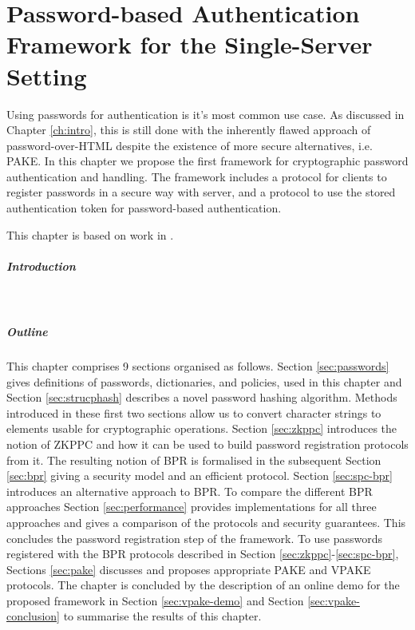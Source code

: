 \chapter[Password Authentication Framework for the Single-Server Setting]{Password-based Authentication Framework for the Single-Server Setting} \label{ch:vpake}

Using passwords for authentication is it's most common use case.
As discussed in Chapter \ref{ch:intro}, this is still done with the inherently flawed approach of password-over-\ac{HTML} despite the existence of more secure alternatives, i.e. \ac{PAKE}.
In this chapter we propose the first framework for cryptographic password authentication and handling.
The framework includes a protocol for clients to register passwords in a secure way with server, and a protocol to use the stored authentication token for password-based authentication.

\smallskip
\noindent
This chapter is based on work in \cite{Kiefer13a,KieferM15a,DongK15a}.

\paragraph{Introduction}
\hfill\\

\paragraph{Outline}
This chapter comprises 9 sections organised as follows.
Section \ref{sec:passwords} gives definitions of passwords, dictionaries, and policies, used in this chapter and Section \ref{sec:strucphash} describes a novel password hashing algorithm.
Methods introduced in these first two sections allow us to convert character strings to elements usable for cryptographic operations.
Section \ref{sec:zkppc} introduces the notion of \ac{ZKPPC} and how it can be used to build password registration protocols from it.
The resulting notion of \ac{BPR} is formalised in the subsequent Section \ref{sec:bpr} giving a security model and an efficient protocol.
Section \ref{sec:spc-bpr} introduces an alternative approach to \ac{BPR}.
To compare the different \ac{BPR} approaches Section \ref{sec:performance} provides implementations for all three approaches and gives a comparison of the protocols and security guarantees.
This concludes the password registration step of the framework.
To use passwords registered with the \ac{BPR} protocols described in Section \ref{sec:zkppc}-\ref{sec:spc-bpr}, Sections \ref{sec:pake} discusses and proposes appropriate \ac{PAKE} and \ac{VPAKE} protocols.
The chapter is concluded by the description of an online demo for the proposed framework in Section \ref{sec:vpake-demo} and Section \ref{sec:vpake-conclusion} to summarise the results of this chapter.

